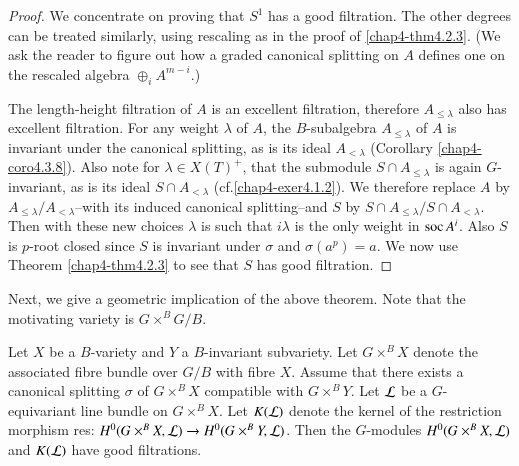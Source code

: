 \begin{proof}
We concentrate on proving that $S^{1}$ has a good filtration. The
other degrees can be treated similarly, using rescaling as in the
proof of \ref{chap4-thm4.2.3}. (We ask the reader to figure out how a
graded canonical splitting on $A$ defines one on the rescaled algebra
$\oplus_{i}A^{m-i}$.)

The length-height filtration of $A$ is an excellent filtration,
therefore $A_{\leq \lambda}$ also has excellent filtration. For any
weight $\lambda$ of $A$, the $B$-subalgebra $A_{\leq\lambda}$ of $A$
is invariant under the canonical splitting, as is its ideal
$A_{<\lambda}$ (Corollary \ref{chap4-coro4.3.8}). Also\pageoriginale
note\label{page46} for $\lambda\in X(T)^{+}$, that the submodule $S\cap A_{\leq
  \lambda}$ is again $G$-invariant, as is its ideal $S\cap
A_{<\lambda}$ (cf.\@ \ref{chap4-exer4.1.2}). We therefore replace $A$
by $A_{\leq \lambda}/A_{<\lambda}$--with its induced canonical
splitting--and $S$ by $S\cap A_{\leq \lambda}/S\cap
A_{<\lambda}$. Then with these new choices $\lambda$ is such that
$i\lambda$ is the only weight in $\operatorname{soc} A^{i}$. Also $S$ is $p$-root
closed since $S$ is invariant under $\sigma$ and $\sigma(a^{p})=a$. We
now use Theorem \ref{chap4-thm4.2.3} to see that $S$ has good filtration.
\end{proof}

Next, we give a geometric implication of the above theorem. Note that
the motivating variety is $G\times^{B}G/B$.

\begin{lemma}\label{chap4-lem4.4.2}
Let $X$ be a $B$-variety and $Y$ a $B$-invariant subvariety. Let
$G\times^{B}X$ denote the associated fibre bundle over $G/B$ with
fibre $X$. Assume that there exists a canonical splitting $\sigma$ of
$G\times^{B}X$ compatible with $G\times^{B}Y$. Let $\mathcal{L}$ be a
$G$-equivariant line bundle on $G\times^{B}X$. Let $K(\mathcal{L})$ denote the
kernel of the restriction morphism res: $H^{0}(G\times^{B}X,\mathcal{L})\to
H^{0}(G\times^{B}Y,\mathcal{L})$. Then the $G$-modules $H^{0}(G\times^{B}X,\mathcal{L})$
and $K(\mathcal{L})$ have good filtrations.
\end{lemma}

